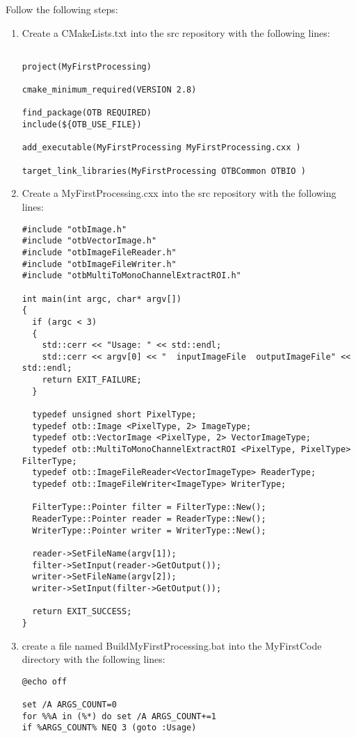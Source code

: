 Follow the following steps:
\begin{enumerate}
\item Create a CMakeLists.txt into the src repository with the following lines:


\begin{verbatim}

project(MyFirstProcessing)

cmake_minimum_required(VERSION 2.8)

find_package(OTB REQUIRED)
include(${OTB_USE_FILE})

add_executable(MyFirstProcessing MyFirstProcessing.cxx )

target_link_libraries(MyFirstProcessing OTBCommon OTBIO )
\end{verbatim}

\item Create a MyFirstProcessing.cxx into the src repository with the following lines:
\begin{verbatim}
#include "otbImage.h"
#include "otbVectorImage.h"
#include "otbImageFileReader.h"
#include "otbImageFileWriter.h"
#include "otbMultiToMonoChannelExtractROI.h"

int main(int argc, char* argv[])
{
  if (argc < 3)
  {
    std::cerr << "Usage: " << std::endl;
    std::cerr << argv[0] << "  inputImageFile  outputImageFile" << std::endl;
    return EXIT_FAILURE;
  }

  typedef unsigned short PixelType;
  typedef otb::Image <PixelType, 2> ImageType;
  typedef otb::VectorImage <PixelType, 2> VectorImageType;
  typedef otb::MultiToMonoChannelExtractROI <PixelType, PixelType> FilterType;
  typedef otb::ImageFileReader<VectorImageType> ReaderType;
  typedef otb::ImageFileWriter<ImageType> WriterType;

  FilterType::Pointer filter = FilterType::New();
  ReaderType::Pointer reader = ReaderType::New();
  WriterType::Pointer writer = WriterType::New();

  reader->SetFileName(argv[1]);
  filter->SetInput(reader->GetOutput());
  writer->SetFileName(argv[2]);
  writer->SetInput(filter->GetOutput());

  return EXIT_SUCCESS;
}
\end{verbatim}
\item create a file named BuildMyFirstProcessing.bat into the MyFirstCode directory with the following lines:
\begin{verbatim}
@echo off

set /A ARGS_COUNT=0    
for %%A in (%*) do set /A ARGS_COUNT+=1  
if %ARGS_COUNT% NEQ 3 (goto :Usage)


\end{verbatim}
\end{enumerate}
